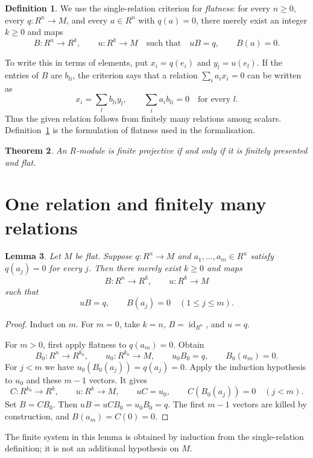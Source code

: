 \documentclass[11pt]{amsart}
\newtheorem{theorem}{Theorem}[section]
\newtheorem{lemma}[theorem]{Lemma}
\theoremstyle{definition}
\newtheorem{definition}[theorem]{Definition}
\newcommand{\id}{\operatorname{id}}
\begin{document}
\begin{definition}\label{def:flat}
We use the single-relation criterion for \emph{flatness}: for every
$n\geq0$, every $q:R^n\to M$, and every $a\in R^n$ with $q(a)=0$,
there merely exist an integer $k\geq0$ and maps
\[
 B:R^n\longrightarrow R^k,\qquad u:R^k\longrightarrow M
 \quad\text{such that}\quad uB=q,\qquad B(a)=0.
\]
\end{definition}

To write this in terms of elements, put $x_i=q(e_i)$ and
$y_l=u(e_l)$. If the entries of $B$ are $b_{li}$, the criterion says
that a relation $\sum_i a_i x_i=0$ can be written as
\[
 x_i=\sum_l b_{li}y_l,\qquad
 \sum_i a_i b_{li}=0\quad\text{for every }l.
\]
Thus the given relation follows from finitely many relations among
scalars. Definition~\ref{def:flat} is the formulation of flatness used
in the formalisation.

\begin{theorem}\label{thm:main}
An $R$-module is finite projective if and only if it is finitely
presented and flat.
\end{theorem}

\section{One relation and finitely many relations}

\begin{lemma}\label{lem:systems}
Let $M$ be flat. Suppose $q:R^n\to M$ and
$a_1,\ldots,a_m\in R^n$ satisfy $q(a_j)=0$ for every $j$. Then there
merely exist $k\geq0$ and maps
\[
 B:R^n\longrightarrow R^k,\qquad u:R^k\longrightarrow M
\]
such that
\[
 uB=q,\qquad B(a_j)=0\quad(1\leq j\leq m).
\]
\end{lemma}
\begin{proof}
Induct on $m$. For $m=0$, take $k=n$, $B=\id_{R^n}$, and $u=q$.

For $m>0$, first apply flatness to $q(a_m)=0$. Obtain
\[
 B_0:R^n\to R^{k_0},\qquad u_0:R^{k_0}\to M,
 \qquad u_0B_0=q,\qquad B_0(a_m)=0.
\]
For $j<m$ we have $u_0(B_0(a_j))=q(a_j)=0$. Apply the induction
hypothesis to $u_0$ and these $m-1$ vectors. It gives
\[
 C:R^{k_0}\to R^k,\qquad u:R^k\to M,
 \qquad uC=u_0,\qquad C(B_0(a_j))=0\quad(j<m).
\]
Set $B=CB_0$. Then $uB=uCB_0=u_0B_0=q$. The first $m-1$ vectors
are killed by construction, and $B(a_m)=C(0)=0$.
\end{proof}

The finite system in this lemma is obtained by induction from the
single-relation definition; it is not an additional hypothesis on $M$.
\end{document}
